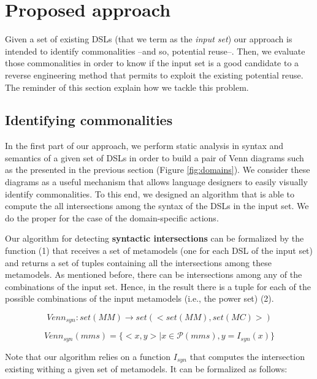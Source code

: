 \section{Proposed approach}

Given a set of existing DSLs (that we term as the \textit{input set}) our approach is intended to identify commonalities --and so, potential reuse--. Then, we evaluate those commonalities in order to know if the input set is a good candidate to a reverse engineering method that permits to exploit the existing potential reuse. The reminder of this section explain how we tackle this problem.

\subsection{Identifying commonalities}
\label{sec:metrics}

In the first part of our approach, we perform static analysis in syntax and semantics of a given set of DSLs in order to build a pair of Venn diagrams such as the presented in the previous section (Figure \ref{fig:domains}). We consider these diagrams as a useful mechanism that allows language designers to easily visually identify commonalities. To this end, we designed an algorithm that is able to compute the all intersections among the syntax of the DSLs in the input set. We do the proper for the case of the domain-specific actions. 

Our algorithm for detecting \textbf{syntactic intersections} can be formalized by the function (1) that receives a set of metamodels (one for each DSL of the input set) and returns a set of tuples containing all the intersections among these metamodels. As mentioned before, there can be intersections among any of the combinations of the input set. Hence, in the result there is a tuple for each of the possible combinations of the input metamodels (i.e., the power set) (2). 

\begin{equation}
  Venn_{syn} : set(MM) \rightarrow set(<set(MM),set(MC)>)
\end{equation}

\begin{equation}
  Venn_{syn}(mms) = \{<x,y> \mid x \in \mathcal{P}(mms), y = I_{syn}(x)\}
\end{equation}

Note that our algorithm relies on a function $I_{syn}$ that computes the intersection existing withing a given set of metamodels. It can be formalized as follows:


